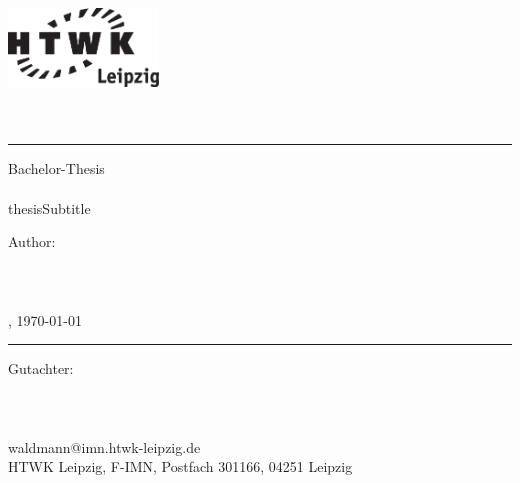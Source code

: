 
\begin{center}
    \includegraphics[width=4cm]{frontpage/HTWK_Logo_schwarz}\\
    \vspace{12pt}
    \large
        \textbf{\thesisUniversity}\\
    \vspace{6pt}
    \normalsize
        \thesisUniversityDepartment\\

    \vspace{24pt}
    \rule{\textwidth}{0.5pt}
    \vspace{12pt}

    \Huge
        Bachelor-Thesis\\
    \vspace{12pt}
    \Large
        \textbf{\thesisTitle}\\
        \ifcsname thesisSubtitle \endcsname
            \large
            \thesisSubtitle
        \else
        \fi
    \vspace{24pt}

    \small
        Author:\\
    \vspace{6pt}
    \large
        \textbf{\thesisAuthor}\\
        \vspace{3pt}
        \normalsize
        \thesisAuthorClass\\
        \thesisAuthorEmail\\
        \thesisAuthorCity, \today\\        

    \vspace{24pt}
    \rule{\textwidth}{0.5pt}
    \vspace{12pt}

    \vfill
    \small
        Gutachter:\\
    \vspace{6pt}
    \large
        \thesisAdvisor\\
    \small
        \thesisUniversity\\
        \thesisUniversityDepartment\\
        waldmann@imn.htwk-leipzig.de\\
        HTWK Leipzig, F-IMN, Postfach 301166, 04251 Leipzig
\end{center}
